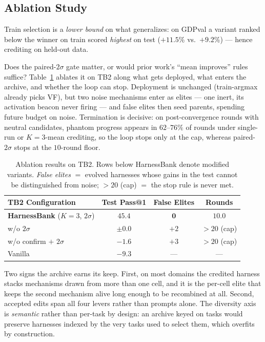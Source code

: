 \subsection{Ablation Study}

Train selection is a \emph{lower bound} on what generalizes: on GDPval a variant ranked
below the winner on train scored \emph{highest} on test ($+11.5\%$ vs.\ $+9.2$\%) --- hence
crediting on held-out data.

Does the paired-$2\sigma$ gate matter, or would prior work's ``mean improves'' rules suffice?
Table~\ref{tab:gates} ablates it on TB2 along what gets deployed, what enters the archive,
and whether the loop can stop. Deployment is unchanged (train-argmax already picks VF), but
two noise mechanisms enter as elites --- one inert, its activation beacon never firing ---
and false elites then seed parents, spending future budget on noise. Termination is decisive:
on post-convergence rounds with neutral candidates, phantom progress appears in
$62$--$76\%$ of rounds under single-run or $K{=}3$-mean crediting, so the loop stops only at
the cap, whereas paired-$2\sigma$ stops at the $10$-round floor.



\begin{table}[t]
\centering
\footnotesize
\setlength{\tabcolsep}{3pt}
\caption{Ablation results on TB2. Rows below HarnessBank denote modified variants.
\emph{False elites} $=$ evolved harnesses whose gains in the test cannot be distinguished from
noise; $>20$ (cap) $=$ the stop rule is never met.}
\label{tab:gates}
\begin{tabular}{lccc}
\toprule
TB2 Configuration & Test Pass@1 & False Elites & Rounds \\
\midrule
\textbf{HarnessBank} ($K{=}3$, $2\sigma$) & $\mathbf{45.4}$ & $\mathbf{0}$ & $\mathbf{10.0}$ \\
w/o $2\sigma$                       & $\pm 0.0$ & $+2$ & $>20$ (cap) \\
w/o confirm $+$ $2\sigma$           & $-1.6$ & $+3$ & $>20$ (cap) \\
Vanilla                             & $-9.3$ & --- & --- \\
\bottomrule
\end{tabular}
\end{table}

Two signs the archive earns its keep. First, on most domains the credited harness
stacks mechanisms drawn from more than one cell, and it is the per-cell elite that
keeps the second mechanism alive long enough to be recombined at all. Second, accepted edits
span all four levers rather than prompts alone. The diversity axis is \emph{semantic} rather than
per-task by design: an archive keyed on tasks would preserve harnesses indexed by the very
tasks used to select them, which overfits by construction.

